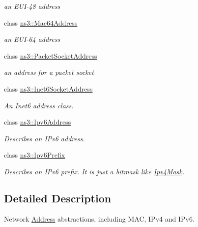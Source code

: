 \begin{DoxyCompactItemize}
\begin{DoxyCompactList}\small\item\em an E\+U\+I-\/48 address \end{DoxyCompactList}\item 
class \hyperlink{classns3_1_1Mac64Address}{ns3\+::\+Mac64\+Address}
\begin{DoxyCompactList}\small\item\em an E\+U\+I-\/64 address \end{DoxyCompactList}\item 
class \hyperlink{classns3_1_1PacketSocketAddress}{ns3\+::\+Packet\+Socket\+Address}
\begin{DoxyCompactList}\small\item\em an address for a packet socket \end{DoxyCompactList}\item 
class \hyperlink{classns3_1_1Inet6SocketAddress}{ns3\+::\+Inet6\+Socket\+Address}
\begin{DoxyCompactList}\small\item\em An Inet6 address class. \end{DoxyCompactList}\item 
class \hyperlink{classns3_1_1Ipv6Address}{ns3\+::\+Ipv6\+Address}
\begin{DoxyCompactList}\small\item\em Describes an I\+Pv6 address. \end{DoxyCompactList}\item 
class \hyperlink{classns3_1_1Ipv6Prefix}{ns3\+::\+Ipv6\+Prefix}
\begin{DoxyCompactList}\small\item\em Describes an I\+Pv6 prefix. It is just a bitmask like \hyperlink{classns3_1_1Ipv4Mask}{Ipv4\+Mask}. \end{DoxyCompactList}\end{DoxyCompactItemize}


\subsection{Detailed Description}
Network \hyperlink{classns3_1_1Address}{Address} abstractions, including M\+AC, I\+Pv4 and I\+Pv6. 